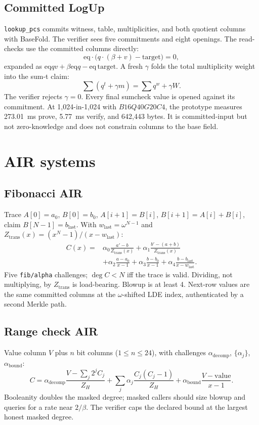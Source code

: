 \documentclass[11pt,a4paper]{article}
\newcommand{\yEq}{\mathrm{eq}}
\begin{document}
\subsection{Committed LogUp}

\texttt{lookup\_pcs} commits witness, table, multiplicities, and both quotient
columns with BaseFold. The verifier sees five commitments and eight openings.
The read-checks use the committed columns directly:
\[
\yEq\cdot\bigl(q\cdot(\beta+v)-\mathrm{target}\bigr)=0,
\]
expanded as $\yEq qv+\beta\yEq q-\yEq\,\mathrm{target}$. A fresh $\gamma$
folds the total multiplicity weight into the sum-t claim:
\[
\sum(q^t+\gamma m)=\sum q^w+\gamma W.
\]
The verifier rejects $\gamma=0$. Every final sumcheck value is opened against
its commitment. At 1,024-in-1,024 with $B16Q40G20C4$, the prototype measures
273.01~ms prove, 5.77~ms verify, and 642,443 bytes. It is committed-input but
not zero-knowledge and does not constrain columns to the base field.

\section{AIR systems}

\subsection{Fibonacci AIR}

Trace $A[0]=a_0$, $B[0]=b_0$, $A[i+1]=B[i]$, $B[i+1]=A[i]+B[i]$, claim
$B[N-1]=b_{\mathrm{last}}$. With $w_{\mathrm{last}}=\omega^{N-1}$ and
$Z_{\mathrm{trans}}(x)=(x^N-1)/(x-w_{\mathrm{last}})$:
\[
\begin{aligned}
C(x)={}&\alpha_0\frac{a'-b}{Z_{\mathrm{trans}}(x)}
+\alpha_1\frac{b'-(a+b)}{Z_{\mathrm{trans}}(x)}\\
&+\alpha_2\frac{a-a_0}{x-1}
+\alpha_3\frac{b-b_0}{x-1}
+\alpha_4\frac{b-b_{\mathrm{last}}}{x-w_{\mathrm{last}}}.
\end{aligned}
\]
Five \texttt{fib/alpha} challenges; $\deg C<N$ iff the trace is valid.
Dividing, not multiplying, by $Z_{\mathrm{trans}}$ is load-bearing. Blowup is
at least 4. Next-row values are the same committed columns at the
$\omega$-shifted LDE index, authenticated by a second Merkle path.

\subsection{Range check AIR}

Value column $V$ plus $n$ bit columns ($1\le n\le24$), with challenges
$\alpha_{\mathrm{decomp}}$, $\{\alpha_j\}$, $\alpha_{\mathrm{bound}}$:
\[
C=\alpha_{\mathrm{decomp}}\frac{V-\sum_j2^jC_j}{Z_H}
+\sum_j\alpha_j\frac{C_j(C_j-1)}{Z_H}
+\alpha_{\mathrm{bound}}\frac{V-\mathrm{value}}{x-1}.
\]
Booleanity doubles the masked degree; masked callers should size blowup and
queries for a rate near $2/\beta$. The verifier caps the declared bound at the
largest honest masked degree.
\end{document}
